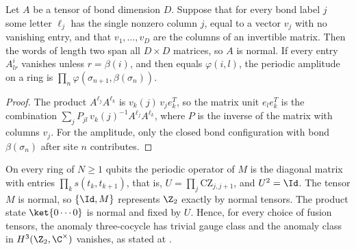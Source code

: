 \begin{lemma}
    \label{thm:mps_forced_column_normality}
    \leanok
    Let $A$ be a tensor of bond dimension $D$. Suppose that for every bond
    label $j$ some letter $\ell_j$ has the single nonzero column $j$, equal to
    a vector $v_j$ with no vanishing entry, and that $v_1,\dots,v_D$ are the
    columns of an invertible matrix. Then the words of length two span all
    $D\times D$ matrices, so $A$ is normal. If every entry $A^i_{lr}$ vanishes
    unless $r=\beta(i)$, and then equals $\varphi(i,l)$, the periodic amplitude
    on a ring is $\prod_n\varphi(\sigma_{n+1},\beta(\sigma_n))$.
\end{lemma}

\begin{proof}\leanok
    The product $A^{\ell_j}A^{\ell_k}$ is $v_k(j)\,v_je_k^{T}$, so the matrix
    unit $e_le_k^T$ is the combination
    $\sum_j P_{jl}\,v_k(j)^{-1}A^{\ell_j}A^{\ell_k}$, where $P$ is the inverse
    of the matrix with columns $v_j$. For the amplitude, only the closed bond
    configuration with bond $\beta(\sigma_n)$ after site $n$ contributes.
\end{proof}

\begin{lemma}
    \label{thm:mpug_controlled_z_not_anomalous}
    \leanok
    On every ring of $N\geq1$ qubits the periodic operator of $M$ is the
    diagonal matrix with entries $\prod_ks(t_k,t_{k+1})$, that is,
    $U=\prod_j\mathrm{CZ}_{j,j+1}$, and $U^2=\Id$. The tensor $M$ is normal, so
    $\{\Id,M\}$ represents $\Z_2$ exactly by normal tensors. The product state
    $\ket{0\cdots0}$ is normal and fixed by $U$. Hence, for every choice of
    fusion tensors, the anomaly three-cocycle has trivial gauge class and the
    anomaly class in $H^3(\Z_2,\C^\times)$ vanishes, as stated at
    \cite[line~3873]{FrancoRubio2025MPUGauging}.
\end{lemma}


